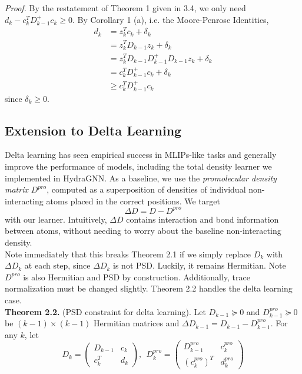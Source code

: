 \documentclass[12pt]{article}
\begin{document}
    \textit{Proof.} By the restatement of Theorem 1 given in 3.4, we only need $d_k - c_k^T D^+_{k-1} c_k \geq 0$. By Corollary 1 (a), i.e. the Moore-Penrose Identities,
    \begin{align*}
        d_k &=  z_k^T c_k + \delta_k \\
        &= z_k^T D_{k-1} z_k + \delta_k \\
        &= z_k^T D_{k-1}D_{k-1}^+ D_{k-1} z_k + \delta_k \\
        &= c_k^TD_{k-1}^+ c_k + \delta_k \\
        &\geq c_k^TD_{k-1}^+ c_k
    \end{align*}
    since $\delta_k \geq 0$. 

    \subsection{Extension to Delta Learning}
    Delta learning has seen empirical success in MLIPs-like tasks and generally improve the performance of models, including the total density learner we implemented in HydraGNN. As a baseline, we use the \textit{promolecular density matrix} $D^{pro}$, computed as a superposition of densities of individual non-interacting atoms placed in the correct positions. We target
    \begin{equation}
        \Delta D = D - D^{pro}
    \end{equation}
    with our learner. Intuitively, $\Delta D$ contains interaction and bond information between atoms, without needing to worry about the baseline non-interacting density. \\[-6pt]

    Note immediately that this breaks Theorem 2.1 if we simply replace $D_k$ with $\Delta D_k$ at each step, since $\Delta D_k$ is not PSD. Luckily, it remains Hermitian. Note $D^{pro}$ is also Hermitian and PSD by construction. Additionally, trace normalization must be changed slightly. Theorem 2.2 handles the delta learning case. \\[-6pt]

    \textbf{Theorem 2.2.} (PSD constraint for delta learning). Let $D_{k-1} \succeq 0$ and $D_{k-1}^{pro} \succeq 0$ be $(k-1) \times (k-1)$ Hermitian matrices and $\Delta D_{k-1} = D_{k-1} - D_{k-1}^{pro}$. For any $k$, let
    \begin{equation}
        D_k = \begin{pmatrix}
            D_{k-1} & c_k \\
            c_k^T & d_k
        \end{pmatrix}, \ \ D_k^{pro} = \begin{pmatrix}
            D_{k-1}^{pro} & c_k^{pro} \\
            (c_k^{pro})^T & d_k^{pro}
        \end{pmatrix}
    \end{equation}  
    
\end{document}
